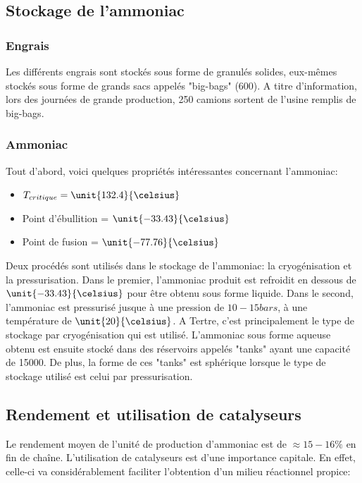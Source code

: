 \subsection{Stockage de l'ammoniac}
\subsubsection{Engrais}
Les différents engrais sont stockés sous forme de granulés solides, eux-mêmes stockés sous forme de grands sacs appelés "big-bags" (\unit{600}{\kilogram}). A titre d'information, lors des journées de grande production, 250 camions sortent de l'usine remplis de big-bags. 
\subsubsection{Ammoniac}
Tout d'abord, voici quelques propriétés intéressantes concernant l'ammoniac:

\begin{itemize}
\item{$T_{critique} = \unit{132.4}{\celsius}$}

\item{Point d'ébullition = $\unit{-33.43}{\celsius}$}

\item{Point de fusion = $\unit{-77.76}{\celsius}$}
\end{itemize}

Deux procédés sont utilisés dans le stockage de l'ammoniac: la cryogénisation et la pressurisation. Dans le premier, l'ammoniac produit est refroidit en dessous de $\unit{-33.43}{\celsius}$ pour être obtenu sous forme liquide. Dans le second, l'ammoniac est pressurisé jusque à une pression de $\unit{10-15}{bars}$, à une température de $\unit{20}{\celsius}$. A Tertre, c'est principalement le type de stockage par cryogénisation qui est utilisé. L'ammoniac sous forme aqueuse obtenu est ensuite stocké dans des réservoirs appelés "tanks" ayant une capacité de \unit{15000}{\tonne}. De plus, la forme de ces "tanks" est sphérique lorsque le type de stockage utilisé est celui par pressurisation.


\subsection{Rendement et utilisation de catalyseurs}
Le rendement moyen de l'unité de production d'ammoniac est de $\approx 15-16\%$ en fin de chaîne. L'utilisation de catalyseurs est d'une importance capitale. En effet, celle-ci va considérablement faciliter l'obtention d'un milieu réactionnel propice:

